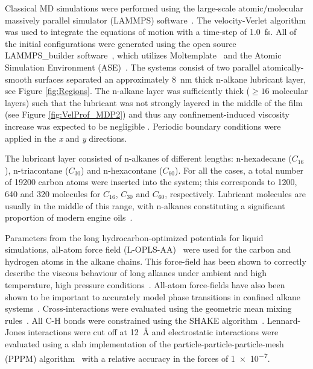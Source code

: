 \documentclass[5p]{elsarticle}
\begin{document}
Classical MD simulations were performed using the large-scale atomic/molecular massively parallel simulator (LAMMPS) software~\cite{Plimpton1995}. The velocity-Verlet algorithm was used to integrate the equations of motion with a time-step of \SI{1.0}{\femto\second}. All of the initial configurations were generated using the open source LAMMPS\_builder software~\cite{Ewen2017b,Ewen2017}, which utilizes Moltemplate~\cite{Jewett2013} and the Atomic Simulation Environment (ASE)~\cite{HjorthLarsen2017}. The systems consist of two parallel atomically-smooth surfaces separated an approximately \SI{8}{\nano\meter} thick n-alkane lubricant layer, see Figure \ref{fig:Regions}. The n-alkane layer was sufficiently thick ($\geq 16$ molecular layers) such that the lubricant was not strongly layered in the middle of the film (see Figure \ref{fig:VelProf_MDP2}) and thus any confinement-induced viscosity increase was expected to be negligible \cite{Gee1990}. Periodic boundary conditions were applied in the \emph{x} and \emph{y} directions.

The lubricant layer consisted of n-alkanes of different lengths: n-hexadecane ($C_{16}$), n-triacontane ($C_{30}$) and n-hexacontane ($C_{60}$). For all the cases, a  total number of 19200 carbon atoms were inserted into the system; this corresponds to 1200, 640 and 320 molecules for $C_{16}$, $C_{30}$ and $C_{60}$, respectively. Lubricant molecules are usually in the middle of this range, with n-alkanes constituting a significant proportion of modern engine oils~\cite{Liang2018}.

Parameters from the long hydrocarbon-optimized potentials for liquid simulations, all-atom force field (L-OPLS-AA)~\cite{Jorgensen1996,Siu2012} were used for the carbon and hydrogen atoms in the alkane chains. This force-field has been shown to correctly describe the viscous behaviour of long alkanes under ambient and high temperature, high pressure conditions~\cite{Ewen2016a}. All-atom force-fields have also been shown to be important to accurately model phase transitions in confined alkane systems~\cite{Docherty2010}. Cross-interactions were evaluated using the geometric mean mixing rules~\cite{Jorgensen1996}. All C-H bonds were constrained using the SHAKE algorithm~\cite{Ryckaert1977}. Lennard-Jones interactions were cut off at \SI{12}{\angstrom} and electrostatic interactions were evaluated using a slab implementation of the particle-particle-particle-mesh (PPPM) algorithm~\cite{Yeh1999} with a relative accuracy in the forces of \SI{1e-7}{}.
\end{document}
